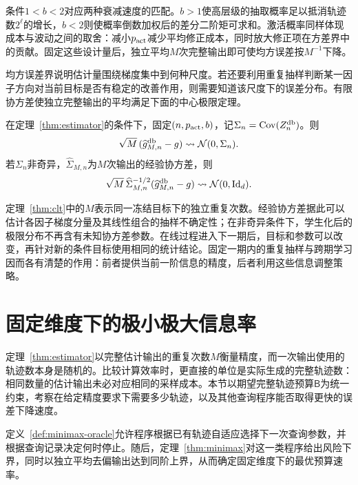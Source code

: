 条件$1<b<2$对应两种衰减速度的匹配。$b>1$使高层级的抽取概率足以抵消轨迹数$2^\ell$的增长，$b<2$则使概率倒数加权后的差分二阶矩可求和。激活概率同样体现成本与波动之间的取舍：减小$p_{\rm act}$减少平均修正成本，同时放大修正项在方差界中的贡献。固定这些设计量后，独立平均$M$次完整输出即可使均方误差按$M^{-1}$下降。

均方误差界说明估计量围绕梯度集中到何种尺度。若还要利用重复抽样判断某一因子方向对当前目标是否有稳定的改善作用，则需要知道该尺度下的误差分布。有限协方差使独立完整输出的平均满足下面的中心极限定理。

\begin{theorem}[固定目标的渐近正态性]\label{thm:clt}
在定理~\ref{thm:estimator}的条件下，固定$(n,p_{\rm act},b)$，记$\Sigma_n=\operatorname{Cov}(Z_n^{\mathrm{db}})$。则
\begin{equation}\label{eq:clt}
 \sqrt M\,(\widehat g_{M,n}^{\mathrm{db}}-g)
 \rightsquigarrow \mathcal N(0,\Sigma_n).
\end{equation}
若$\Sigma_n$非奇异，$\widehat\Sigma_{M,n}$为$M$次输出的经验协方差，则
\begin{equation}\label{eq:studentized-clt}
 \sqrt M\,\widehat\Sigma_{M,n}^{-1/2}
 (\widehat g_{M,n}^{\mathrm{db}}-g)
 \rightsquigarrow \mathcal N(0,\mathrm{Id}_d).
\end{equation}
\end{theorem}

定理~\ref{thm:clt}中的$M$表示同一冻结目标下的独立重复次数。经验协方差据此可以估计各因子梯度分量及其线性组合的抽样不确定性；在非奇异条件下，学生化后的极限分布不再含有未知协方差参数。在线过程进入下一期后，目标和参数可以改变，再针对新的条件目标使用相同的统计结论。固定一期内的重复抽样与跨期学习因而各有清楚的作用：前者提供当前一阶信息的精度，后者利用这些信息调整策略。

\section{固定维度下的极小极大信息率}

定理~\ref{thm:estimator}以完整估计输出的重复次数$M$衡量精度，而一次输出使用的轨迹数本身是随机的。比较计算效率时，更直接的单位是实际生成的完整轨迹数：相同数量的估计输出未必对应相同的采样成本。本节以期望完整轨迹预算$\mathsf B$为统一约束，考察在给定精度要求下需要多少轨迹，以及其他查询程序能否取得更快的误差下降速度。

定义~\ref{def:minimax-oracle}允许程序根据已有轨迹自适应选择下一次查询参数，并根据查询记录决定何时停止。随后，定理~\ref{thm:minimax}对这一类程序给出风险下界，同时以独立平均去偏输出达到同阶上界，从而确定固定维度下的最优预算速率。

